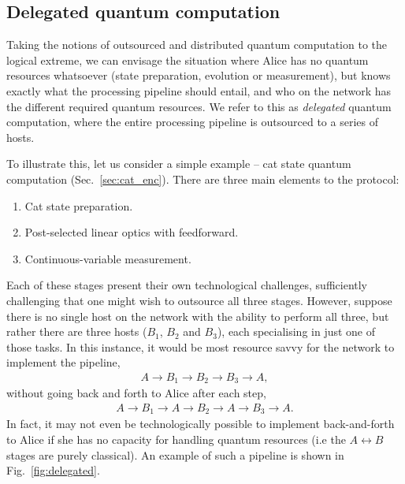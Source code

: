 %
%

\subsection{Delegated quantum computation} 

Taking the notions of outsourced and distributed quantum computation to the logical extreme, we can envisage the situation where Alice has no quantum resources whatsoever (state preparation, evolution or measurement), but knows exactly what the processing pipeline should entail, and who on the network has the different required quantum resources. We refer to this as \textit{delegated} quantum computation, where the entire processing pipeline is outsourced to a series of hosts.

To illustrate this, let us consider a simple example -- cat state quantum computation (Sec.~\ref{sec:cat_enc}). There are three main elements to the protocol:
\begin{enumerate}
\item Cat state preparation.
\item Post-selected linear optics with feedforward.
\item Continuous-variable measurement.
\end{enumerate}

Each of these stages present their own technological challenges, sufficiently challenging that one might wish to outsource all three stages. However, suppose there is no single host on the network with the ability to perform all three, but rather there are three hosts ($B_1$, $B_2$ and $B_3$), each specialising in just one of those tasks. In this instance, it would be most resource savvy for the network to implement the pipeline,
\begin{align}
	A\to B_1\to B_2\to B_3\to A,
\end{align}
without going back and forth to Alice after each step,
\begin{align}
	A\to B_1\to A\to B_2 \to A\to B_3\to A.
\end{align}
In fact, it may not even be technologically possible to implement back-and-forth to Alice if she has no capacity for handling quantum resources (i.e the \mbox{$A\leftrightarrow B$} stages are purely classical). An example of such a pipeline is shown in Fig.~\ref{fig:delegated}.

